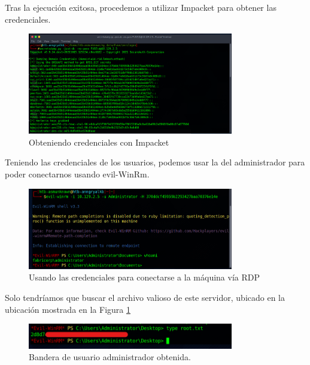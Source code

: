 \documentclass{article}
\begin{document}
\clearpage
Tras la ejecución exitosa, procedemos a utilizar Impacket para obtener las credenciales.

\begin{figure}[h]
	\center
	\includegraphics[width=0.8\textwidth]{images/fuse/image19.png}
	\caption{Obteniendo credenciales con Impacket}
\end{figure}

Teniendo las credenciales de los usuarios, podemos usar la del administrador para poder conectarnos usando evil-WinRm.

\begin{figure}[h]
	\center
	\includegraphics[width=0.8\textwidth]{images/fuse/image20.png}
	\caption{Usando las credenciales para conectarse a la máquina vía RDP}
\end{figure}

Solo tendríamos que buscar el archivo valioso de este servidor, ubicado en la ubicación mostrada en la Figura \ref{get_root_fuse}

\begin{figure}[h]
	\center
	\includegraphics[width=0.8\textwidth]{images/fuse/image21.png}
	\caption{Bandera de usuario administrador obtenida.}
	\label{get_root_fuse}
\end{figure}
\clearpage
\end{document}
